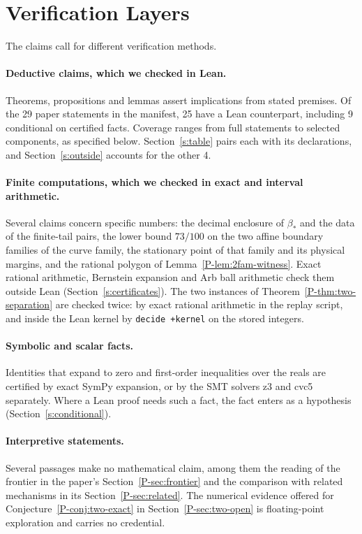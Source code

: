 \documentclass[11pt]{article}
\newcommand{\pref}[1]{\ref*{P-#1}}
\newcommand{\lean}[1]{\begingroup\def\_{\textunderscore\allowbreak}\texttt{\small #1}\endgroup}
\begin{document}
\section{Verification Layers}

The claims call for different verification methods.

\paragraph{Deductive claims, which we checked in Lean.}
Theorems, propositions and lemmas assert implications from stated premises.
Of the 29 paper statements in the manifest, 25 have a Lean counterpart,
including 9 conditional on certified facts. Coverage ranges from full
statements to selected components, as specified below.
Section~\ref{s:table} pairs each with its declarations, and
Section~\ref{s:outside} accounts for the other 4.

\paragraph{Finite computations, which we checked in exact and interval arithmetic.}
Several claims concern specific numbers: the decimal enclosure of
$\beta_*$ and the data of the finite-tail pairs, the lower bound $73/100$ on
the two affine boundary families of the curve family, the stationary point
of that family and its physical margins, and the rational polygon of
Lemma~\pref{lem:2fam-witness}. Exact rational arithmetic, Bernstein
expansion and Arb ball arithmetic check them outside Lean
(Section~\ref{s:certificates}). The two instances of
Theorem~\pref{thm:two-separation} are checked twice: by exact rational
arithmetic in the replay script, and inside the Lean kernel by
\lean{decide +kernel} on the stored integers.

\paragraph{Symbolic and scalar facts.}
Identities that expand to zero and first-order inequalities over the reals
are certified by exact SymPy expansion, or by the SMT solvers z3 and cvc5
separately. Where a Lean proof needs such a fact, the fact enters as a
hypothesis (Section~\ref{s:conditional}).

\paragraph{Interpretive statements.}
Several passages make no mathematical claim, among them the reading of the
frontier in the paper's Section~\pref{sec:frontier} and the comparison with
related mechanisms in its Section~\pref{sec:related}. The numerical evidence offered for
Conjecture~\pref{conj:two-exact} in Section~\pref{sec:two-open} is
floating-point exploration and carries no credential.
\end{document}
